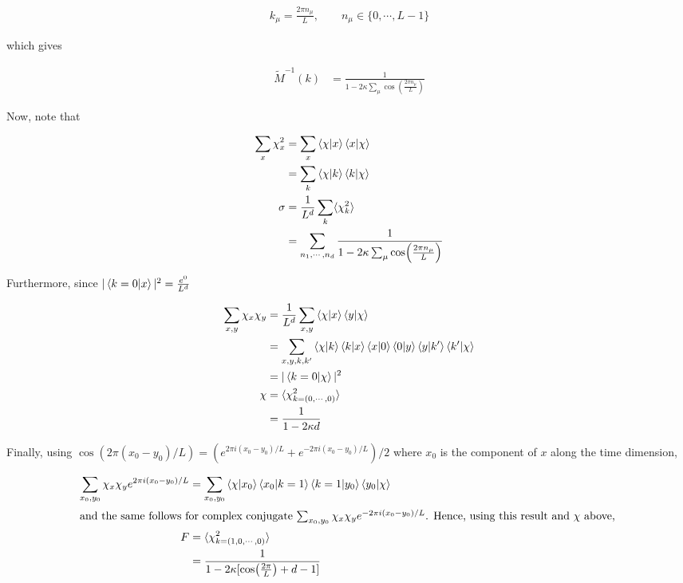 \documentclass[12]{report}
\newcommand\0{\mathbf{0}}
\newcommand\<{\langle}
\renewcommand\>{\rangle}
\begin{document}
\begin{align*}
	k_\mu = \frac{2\pi n_\mu}{L}, \qquad n_\mu \in \{0, \cdots, L - 1 \}
\end{align*}

which gives

\begin{align*}
	\tilde{M}^{-1}(k) &= \frac{1}{1 - 2\kappa \sum_{\mu} \cos(\frac{2\pi n_\mu}{L})}
\end{align*}


Now, note that

\begin{align*}
\sum_x \chi_x^2 &= \sum_x \bra{\chi}\ket{x}	\bra{x}\ket{\chi}\\
&= \sum_k \bra{\chi}\ket{k}	\bra{k}\ket{\chi}\\
\sigma &= \frac{1}{L^d}\sum_k \langle \chi^2_k \rangle\\
&=  \sum_{n_1, \cdots, n_d} \frac{1}{1 - 2\kappa \sum_{\mu} \cos(\frac{2\pi n_\mu}{L})}
\end{align*}

Furthermore, since $|\bra{k=0}\ket{x}|^2 = \frac{e^{0}}{L^d}$ 

\begin{align*}
\sum_{x,y} \chi_x \chi_y &= \frac{1}{L^d} \sum_{x, y} \bra{\chi}\ket{x}  \bra{y}\ket{\chi} \\
&= \sum_{x, y, k, k'} \bra{\chi}\ket{k}\bra{k}\ket{x}\bra{x}\ket{0}\bra{0}\ket{y} \bra{y}\ket{k'}\bra{k'}\ket{\chi} \\
&= |\bra{k=0}\ket{\chi}|^2 \\
\chi &= \langle \chi^2_{k={(0, \cdots, 0)}} \rangle \\
&= \frac{1}{1 - 2\kappa d}
\end{align*}

Finally, using $\cos(2\pi (x_0 - y_0) / L) = (e^{2\pi i (x_0 - y_0) / L} + e^{-2\pi i (x_0 - y_0) / L})/2$ where $x_0$ is the component of $x$ along the time dimension,

\begin{align*}
\sum_{x_0,y_0} \chi_x \chi_y e^{2\pi i (x_0 - y_0) / L} &= \sum_{x_0,y_0}  \bra{\chi}\ket{x_0} \bra{x_0}\ket{k = 1} \bra{k = 1}\ket{y_0} \bra{y_0}\ket{\chi} \\
\intertext{and the same follows for complex conjugate $\sum_{x_0,y_0} \chi_x \chi_y e^{-2\pi i (x_0 - y_0) / L}$. Hence, using this result and $\chi$ above, }
F &= \langle \chi^2_{k={(1, 0, \cdots, 0)}} \rangle  \\
&= \frac{1}{1 - 2\kappa [\cos(\frac{2\pi}{L}) + d-1]}
\end{align*}
\end{document}
